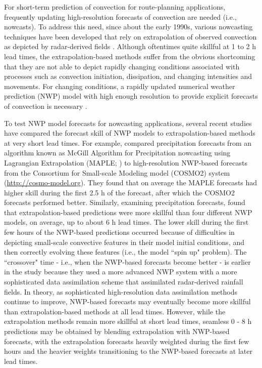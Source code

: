 \documentclass[12pt]{article}
\begin{document}
 For short-term prediction of convection for route-planning applications, frequently updating high-resolution forecasts of convection are needed (i.e., nowcasts). To address this need, since about the early 1990s, various nowcasting techniques have been developed that rely on extrapolation of observed convection as depicted by radar-derived fields \citep{dixon93, li95, germann02, germann04, manda++12}. Although oftentimes quite skillful at 1 to 2 h lead times, the extrapolation-based methods suffer from the obvious shortcoming that they are not able to depict rapidly changing conditions associated with processes such as convection initiation, dissipation, and changing intensities and movements. For changing conditions, a rapidly updated numerical weather prediction (NWP) model with high enough resolution to provide explicit forecasts of convection is necessary \citep{stratman2013}.
 
 To test NWP model forecasts for nowcasting applications, several recent studies have compared the forecast skill of NWP models to extrapolation-based methods at very short lead times. For example, \citet{manda++12} compared precipitation forecasts from an algorithm known as McGill Algorithm for Precipitation nowcasting using Lagrangian Extrapolation (MAPLE; \citealt{germann02}) to high-resolution NWP-based forecasts from the Consortium for Small-scale Modeling model (COSMO2) system (\url{http://cosmo-model.org}). They found that on average the MAPLE forecasts had higher skill during the first 2.5 h of the forecast, after which the COSMO2 forecasts performed better. Similarly, examining precipitation forecasts, \citet{lin++05} found that extrapolation-based predictions were more skillful than four different NWP models, on average, up to about 6 h lead times. The lower skill during the first few hours of the NWP-based predictions occurred because of difficulties in depicting small-scale convective features in their model initial conditions, and then correctly evolving these features (i.e., the model ``spin up" problem). The ``crossover" time - i.e., when the NWP-based forecasts become better - is earlier in the \citet{germann02} study because they used a more advanced NWP system with a more sophisticated data assimilation scheme that assimilated radar-derived rainfall fields. In theory, as sophisticated high-resolution data assimilation methods continue to improve, NWP-based forecasts may eventually become more skillful than extrapolation-based methods at all lead times. However, while the extrapolation methods remain more skillful at short lead times, seamless 0 - 8 h predictions may be obtained by blending extrapolation with NWP-based forecasts, with the extrapolation forecasts heavily weighted during the first few hours and the heavier weights transitioning to the NWP-based forecasts at later lead times.
 
\end{document}
